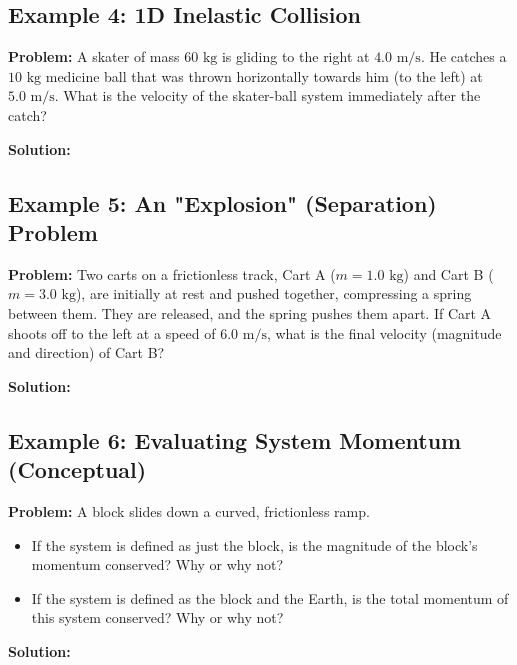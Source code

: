\documentclass{article}
\begin{document}
\subsection*{Example 4: 1D Inelastic Collision}
\textbf{Problem:} A skater of mass $60 \text{ kg}$ is gliding to the right at $4.0 \text{ m/s}$. He catches a $10 \text{ kg}$ medicine ball that was thrown horizontally towards him (to the left) at $5.0 \text{ m/s}$. What is the velocity of the skater-ball system immediately after the catch?

\textbf{Solution:}

\vspace{5cm}

\subsection*{Example 5: An "Explosion" (Separation) Problem}
\textbf{Problem:} Two carts on a frictionless track, Cart A ($m = 1.0 \text{ kg}$) and Cart B ($m = 3.0 \text{ kg}$), are initially at rest and pushed together, compressing a spring between them. They are released, and the spring pushes them apart. If Cart A shoots off to the left at a speed of $6.0 \text{ m/s}$, what is the final velocity (magnitude and direction) of Cart B?

\textbf{Solution:}

\vspace{4.5cm}

\subsection*{Example 6: Evaluating System Momentum (Conceptual)}
\textbf{Problem:} A block slides down a curved, frictionless ramp. 
\begin{itemize}
    \item[(a)] If the system is defined as just the block, is the magnitude of the block's momentum conserved? Why or why not?
    \item[(b)] If the system is defined as the block and the Earth, is the total momentum of this system conserved? Why or why not?
\end{itemize}

\textbf{Solution:}

\vspace{4.5cm}
\end{document}
